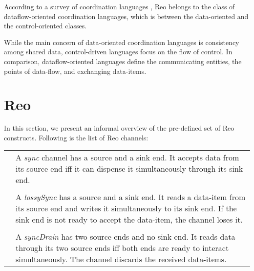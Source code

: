 According to a survey of coordination languages \cite{desurvey}, Reo belongs to the class of dataflow-oriented coordination languages, which is between the data-oriented and the control-oriented classes. 

While the main concern of data-oriented coordination languages is consistency among shared data, control-driven languages focus on the flow of control. In comparison, dataflow-oriented languages define the communicating entities, the points of data-flow, and exchanging data-items.

\section{Reo}
In this section, we present an informal overview of the pre-defined set of Reo constructs. %
Following is the list of Reo channels:
\begin{table}[H]
\begin{tabular}{cp{10cm}}
       \raisebox{-.1cm}{\sync} & A \emph{sync} channel has a source and a sink end. It accepts data from its source end iff it can dispense it simultaneously through its sink end.
       \\& \\
         \raisebox{-.18cm}{\lossysync} & A \emph{lossySync} has a source and a sink end. It reads a data-item from its source end and writes it simultaneously to its sink end. If the sink end is not ready to accept the data-item, the channel loses it.
\\ & \\
  \raisebox{-.18cm}{\syncdrain} & A \emph{syncDrain} has two source ends and no sink end. It reads data through its two source ends iff both ends are ready to interact simultaneously. The channel discards the received data-items. \\
       \end{tabular}
\end{table}

